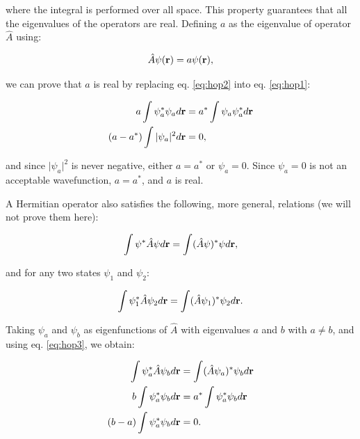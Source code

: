 \documentclass[
  english,
  9pt,
]{extbook}
\theoremstyle{definition}
\theoremstyle{definition}
\theoremstyle{definition}
\theoremstyle{definition}
\theoremstyle{remark}
\begin{document}
where the integral is performed over all space. This property guarantees that all the eigenvalues of the operators are real. Defining \(a\) as the eigenvalue of operator \(\hat{A}\) using:

\begin{equation}
\hat{A} \psi({\bf r}) = a \psi({\bf r}),
\label{eq:hop2}
\end{equation}

we can prove that \(a\) is real by replacing eq. \eqref{eq:hop2} into eq. \eqref{eq:hop1}:

\begin{equation}
\begin{aligned}
a \int \psi_a^{*} \psi_a d{\bf r}&= a^{*} \int \psi_a \psi_a^{*} d{\bf r}\\
(a - a^{*}) \int \vert\psi_a\vert^2 d{\bf r} &= 0,
\end{aligned}
\label{eq:hop4}
\end{equation}

and since \(\vert\psi_a\vert^2\) is never negative, either \(a = a^{*}\) or \(\psi_a = 0\). Since \(\psi_a = 0\) is not an acceptable wavefunction, \(a = a^{*}\), and \(a\) is real.

A Hermitian operator also satisfies the following, more general, relations (we will not prove them here):

\begin{equation}
\int \psi^{*}\hat{A} \psi d{\bf r} = \int (\hat{A} \psi)^{*} \psi d{\bf r},
\label{eq:hop2b}
\end{equation}

and for any two states \(\psi_1\) and \(\psi_2\):

\begin{equation}
\int \psi_1^{*} \hat{A} \psi_2 d{\bf r}=
\int (\hat{A} \psi_1)^{*} \psi_2 d{\bf r}.
\label{eq:hop3}
\end{equation}

Taking \(\psi_a\) and \(\psi_b\) as eigenfunctions of \(\hat{A}\) with eigenvalues \(a\) and \(b\) with \(a \neq b\), and using eq. \eqref{eq:hop3}, we obtain:

\begin{equation}
\begin{aligned}
\int \psi_a^{*} \hat{A} \psi_b d{\bf r} &= \int (\hat{A} \psi_a)^{*} \psi_b d{\bf r}\\
b \int \psi_a^{*} \psi_b d{\bf r}   &= a^{*} \int \psi_a^{*} \psi_b d{\bf r}\\
(b - a) \int \psi_a^{*} \psi_b d{\bf r} &= 0.
\end{aligned}
\label{eq:hop5}
\end{equation}
\end{document}
